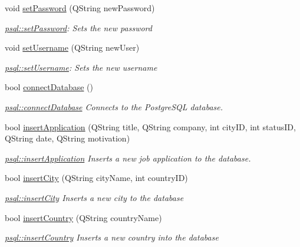 \begin{DoxyCompactItemize}
void \mbox{\hyperlink{classpsql_a6c29350037550b7e5a5bb8f439c405f3}{set\+Password}} (Q\+String new\+Password)
\begin{DoxyCompactList}\small\item\em \mbox{\hyperlink{classpsql_a6c29350037550b7e5a5bb8f439c405f3}{psql\+::set\+Password}}\+: Sets the new password \end{DoxyCompactList}\item 
void \mbox{\hyperlink{classpsql_a1488a9e4909abd172651b7be240342cb}{set\+Username}} (Q\+String new\+User)
\begin{DoxyCompactList}\small\item\em \mbox{\hyperlink{classpsql_a1488a9e4909abd172651b7be240342cb}{psql\+::set\+Username}}\+: Sets the new username \end{DoxyCompactList}\item 
bool \mbox{\hyperlink{classpsql_ada485c933df77453629e3821ab19fa4c}{connect\+Database}} ()
\begin{DoxyCompactList}\small\item\em \mbox{\hyperlink{classpsql_ada485c933df77453629e3821ab19fa4c}{psql\+::connect\+Database}} Connects to the Postgre\+S\+QL database. \end{DoxyCompactList}\item 
bool \mbox{\hyperlink{classpsql_a03f773904e698853caa0fcdb1f5b3809}{insert\+Application}} (Q\+String title, Q\+String company, int city\+ID, int status\+ID, Q\+String date, Q\+String motivation)
\begin{DoxyCompactList}\small\item\em \mbox{\hyperlink{classpsql_a03f773904e698853caa0fcdb1f5b3809}{psql\+::insert\+Application}} Inserts a new job application to the database. \end{DoxyCompactList}\item 
bool \mbox{\hyperlink{classpsql_a767b85014d9df3eac148730f18888d6d}{insert\+City}} (Q\+String city\+Name, int country\+ID)
\begin{DoxyCompactList}\small\item\em \mbox{\hyperlink{classpsql_a767b85014d9df3eac148730f18888d6d}{psql\+::insert\+City}} Inserts a new city to the database \end{DoxyCompactList}\item 
bool \mbox{\hyperlink{classpsql_ab3b5934ce3fbc4be1730d990d4142893}{insert\+Country}} (Q\+String country\+Name)
\begin{DoxyCompactList}\small\item\em \mbox{\hyperlink{classpsql_ab3b5934ce3fbc4be1730d990d4142893}{psql\+::insert\+Country}} Inserts a new country into the database \end{DoxyCompactList}\item 

\end{DoxyCompactItemize}
